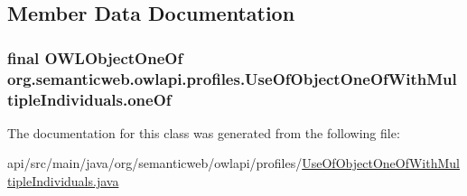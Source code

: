 \subsection{Member Data Documentation}
\hypertarget{classorg_1_1semanticweb_1_1owlapi_1_1profiles_1_1_use_of_object_one_of_with_multiple_individuals_a074d978521458b7e7f909a4c11f75261}{
\subsubsection[{one\-Of}]{\setlength{\rightskip}{0pt plus 5cm}final {\bf O\-W\-L\-Object\-One\-Of} org.\-semanticweb.\-owlapi.\-profiles.\-Use\-Of\-Object\-One\-Of\-With\-Multiple\-Individuals.\-one\-Of\hspace{0.3cm}{\ttfamily [private]}}}\label{classorg_1_1semanticweb_1_1owlapi_1_1profiles_1_1_use_of_object_one_of_with_multiple_individuals_a074d978521458b7e7f909a4c11f75261}


The documentation for this class was generated from the following file\-:\begin{DoxyCompactItemize}
\item 
api/src/main/java/org/semanticweb/owlapi/profiles/\hyperlink{_use_of_object_one_of_with_multiple_individuals_8java}{Use\-Of\-Object\-One\-Of\-With\-Multiple\-Individuals.\-java}\end{DoxyCompactItemize}
